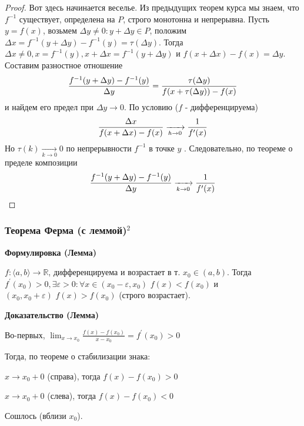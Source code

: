 \documentclass{article}
\def\dbl{\,\,}
\begin{document}
\begin{proof}
Вот здесь начинается веселье. Из предыдущих теорем курса мы знаем, что$ f^{-1}$ существует, определена на $P$, строго монотонна и непрерывна. Пусть $y = f(x)$, возьмем $\Delta y \neq 0: y + \Delta y \in P$, положим $\Delta x = f^{-1}(y + \Delta y) - f^{-1}(y) = \tau(\Delta y)$. Тогда $\Delta x \neq 0, x = f^{-1}(y),  x + \Delta x = f^{-1}(y + \Delta y)$ и $f(x + \Delta x) - f(x) = \Delta y$. Составим разностное отношение
\begin{equation}
\frac{f^{-1}(y + \Delta y) - f^{-1}(y)} {\Delta y} = \frac{\tau(\Delta y)} {f(x + \tau(\Delta y)) - f(x)} \notag
\end{equation}
и найдем его предел при $\Delta y \to 0$. По условию ($f$ - дифференцируема)
\begin{equation}
\frac{\Delta x} {f(x + \Delta x) - f(x)} \xrightarrow[h\to 0]{} \frac{1} {f'(x)}\notag
\end{equation}
Но $\tau(k) \xrightarrow[k\to 0]{} 0$ по непрерывности $f^{-1}$ в точке $y$ 	 . Следовательно, по теореме о пределе композиции
\begin{equation}
\frac{f^{-1}(y + \Delta y) - f^{-1}(y)} {\Delta y} \xrightarrow[k\to 0]{} \frac{1} {f'(x)}\notag
\end{equation}
\end{proof}

\subsubsection{Теорема Ферма (с леммой)\texorpdfstring{$^2$}{}}

\textbf{Формулировка (Лемма)}

$f: \langle a, b \rangle \rightarrow \mathbb{R}$, дифференцируема и возрастает в т. $x_0 \in (a, b)$. Тогда $f^\prime(x_0) > 0, \exists \varepsilon > 0 : \forall x \in (x_0 - \varepsilon, x_0) \dbl f(x) < f(x_0)$ и $(x_0, x_0 + \varepsilon) \dbl f(x) > f(x_0)$ (строго возрастает).


\textbf{Доказательство (Лемма)}

Во-первых, $\lim_{x \rightarrow x_0}{\frac{f(x) - f(x_0)}{x - x_0}} = f^\prime(x_0) > 0$

Тогда, по теореме о стабилизации знака:

$x \rightarrow x_0 + 0$ (справа), тогда $f(x) - f(x_0) > 0$

$x \rightarrow x_0 + 0$ (слева), тогда $f(x) - f(x_0) < 0$

Сошлось (вблизи $x_0$).
\end{document}
